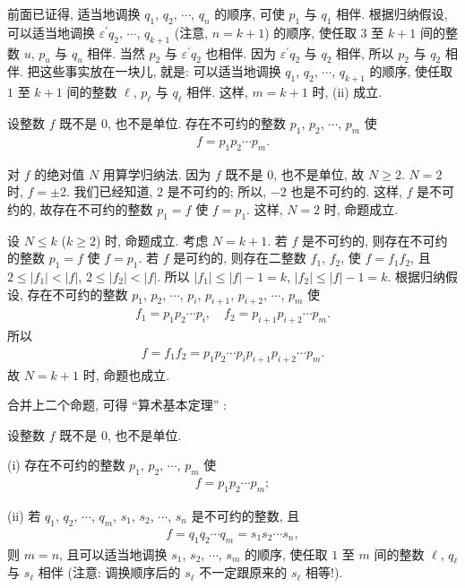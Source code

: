 \begin{pf}
    前面已证得, 适当地调换 $q_1$, $q_2$, $\cdots$, $q_n$ 的顺序, 可使 $p_1$ 与 $q_1$ 相伴. 根据归纳假设, 可以适当地调换 $\varepsilon^{\prime} q_2$, $\cdots$, $q_{k+1}$ (注意, $n = k+1$) 的顺序, 使任取 $3$ 至 $k+1$ 间的整数 $u$, $p_u$ 与 $q_u$ 相伴. 当然 $p_2$ 与 $\varepsilon^{\prime} q_2$ 也相伴. 因为 $\varepsilon^{\prime} q_2$ 与 $q_2$ 相伴, 所以 $p_2$ 与 $q_2$ 相伴. 把这些事实放在一块儿, 就是: 可以适当地调换 $q_1$, $q_2$, $\cdots$, $q_{k+1}$ 的顺序, 使任取 $1$ 至 $k+1$ 间的整数 $\ell$, $p_{\ell}$ 与 $q_{\ell}$ 相伴. 这样, $m = k+1$ 时, (ii) 成立.
\end{pf}

\begin{proposition}
    设整数 $f$ 既不是 $0$, 也不是单位. 存在不可约的整数 $p_1$, $p_2$, $\cdots$, $p_m$ 使
    \begin{align*}
        f = p_1 p_2 \cdots p_m.
    \end{align*}
\end{proposition}

\begin{pf}
    对 $f$ 的绝对值 $N$ 用算学归纳法. 因为 $f$ 既不是 $0$, 也不是单位, 故 $N \geq 2$. $N = 2$ 时, $f = \pm 2$. 我们已经知道, $2$ 是不可约的; 所以, $-2$ 也是不可约的. 这样, $f$ 是不可约的, 故存在不可约的整数 $p_1 = f$ 使 $f = p_1$. 这样, $N = 2$ 时, 命题成立.

    设 $N \leq k$ ($k \geq 2$) 时, 命题成立. 考虑 $N = k+1$. 若 $f$ 是不可约的, 则存在不可约的整数 $p_1 = f$ 使 $f = p_1$. 若 $f$ 是可约的, 则存在二整数 $f_1$, $f_2$, 使 $f = f_1 f_2$, 且 $2 \leq |f_1| < |f|$, $2 \leq |f_2| < |f|$. 所以 $|f_1| \leq |f| - 1 = k$, $|f_2| \leq |f| - 1 = k$. 根据归纳假设, 存在不可约的整数 $p_1$, $p_2$, $\cdots$, $p_i$, $p_{i+1}$, $p_{i+2}$, $\cdots$, $p_m$ 使
    \begin{align*}
        f_1 = p_1 p_2 \cdots p_i, \quad f_2 = p_{i+1} p_{i+2} \cdots p_m.
    \end{align*}
    所以
    \begin{align*}
        f = f_1 f_2 = p_1 p_2 \cdots p_i p_{i+1} p_{i+2} \cdots p_m.
    \end{align*}
    故 $N = k+1$ 时, 命题也成立.
\end{pf}

合并上二个命题, 可得 ``算术基本定理'' :
\begin{proposition}
    设整数 $f$ 既不是 $0$, 也不是单位.

    (i) 存在不可约的整数 $p_1$, $p_2$, $\cdots$, $p_m$ 使
    \begin{align*}
        f = p_1 p_2 \cdots p_m;
    \end{align*}

    (ii) 若 $q_1$, $q_2$, $\cdots$, $q_m$, $s_1$, $s_2$, $\cdots$, $s_n$ 是不可约的整数, 且
    \begin{align*}
        f = q_1 q_2 \cdots q_m = s_1 s_2 \cdots s_n,
    \end{align*}
    则 $m = n$, 且可以适当地调换 $s_1$, $s_2$, $\cdots$, $s_m$ 的顺序, 使任取 $1$ 至 $m$ 间的整数 $\ell$, $q_\ell$ 与 $s_\ell$ 相伴 (注意: 调换顺序后的 $s_\ell$ 不一定跟原来的 $s_\ell$ 相等!).
\end{proposition}

